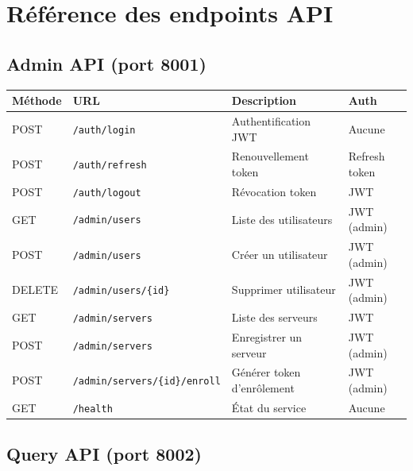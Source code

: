 \chapter{Référence des endpoints API}

\section{Admin API (port 8001)}

\begin{longtable}{llp{4.5cm}p{3.5cm}}
\toprule
\textbf{Méthode} & \textbf{URL} & \textbf{Description} & \textbf{Auth} \\
\midrule
\endhead
\bottomrule
\endfoot
POST & \texttt{/auth/login}   & Authentification JWT & Aucune \\
POST & \texttt{/auth/refresh} & Renouvellement token & Refresh token \\
POST & \texttt{/auth/logout}  & Révocation token     & JWT \\
GET  & \texttt{/admin/users}  & Liste des utilisateurs & JWT (admin) \\
POST & \texttt{/admin/users}  & Créer un utilisateur & JWT (admin) \\
DELETE & \texttt{/admin/users/\{id\}} & Supprimer utilisateur & JWT (admin) \\
GET  & \texttt{/admin/servers} & Liste des serveurs  & JWT \\
POST & \texttt{/admin/servers} & Enregistrer un serveur & JWT (admin) \\
POST & \texttt{/admin/servers/\{id\}/enroll} & Générer token d'enrôlement & JWT (admin) \\
GET  & \texttt{/health}        & État du service      & Aucune \\
\end{longtable}

\section{Query API (port 8002)}

